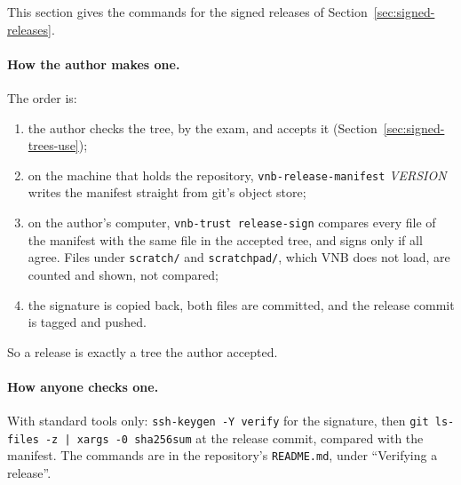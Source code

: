 This section gives the commands for the signed releases of
Section~\ref{sec:signed-releases}.

\paragraph{How the author makes one.}  The order is:
\begin{enumerate}
\item the author checks the tree, by the exam, and accepts it
  (Section~\ref{sec:signed-trees-use});
\item on the machine that holds the repository, \texttt{vnb-release-manifest} \textit{VERSION}
  writes the manifest straight from git's object store;
\item on the author's computer, \texttt{vnb-trust release-sign}
  compares every file of the manifest with the same file in the
  accepted tree, and signs only if all agree.  Files under
  \texttt{scratch/} and \texttt{scratchpad/}, which VNB does not load,
  are counted and shown, not compared;
\item the signature is copied back, both files are committed, and the
  release commit is tagged and pushed.
\end{enumerate}
So a release is exactly a tree the author accepted.

\paragraph{How anyone checks one.}  With standard tools only:
\texttt{ssh-keygen -Y verify} for the signature, then
\texttt{git ls-files -z | xargs -0 sha256sum} at the release commit,
compared with the manifest.  The commands are in the repository's
\texttt{README.md}, under ``Verifying a release''.

